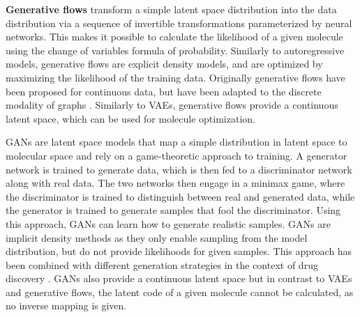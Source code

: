\textbf{Generative flows} \citep{rezendeVariationalInferenceNormalizing2015} transform a simple
latent space distribution into the data distribution via a sequence of invertible transformations
parameterized by neural networks. This makes it possible to calculate the likelihood of a given
molecule using the change of variables formula of probability. Similarly to autoregressive models,
generative flows are explicit density models, and are optimized by maximizing the likelihood of the
training data. Originally generative flows have been proposed for continuous data, but have been
adapted to the discrete modality of graphs
\citep{madhawaGraphNVPInvertibleFlow2019,satorrasEquivariantNormalizingFlows2021,shiGraphAFFlowbasedAutoregressive2019,kuznetsovMolGrowGraphNormalizing2021}.
Similarly to \acp{VAE}, generative flows provide a continuous latent space, which can be used for
molecule optimization.

\Acp{GAN} \citep{goodfellowGenerativeAdversarialNets2014} are latent space models that map a
simple distribution in latent space to molecular space and rely on a game-theoretic approach to
training. A generator network is trained to generate data, which is then fed to a discriminator
network along with real data. The two networks then engage in a minimax game, where the
discriminator is trained to distinguish between real and generated data, while the generator is
trained to generate samples that fool the discriminator. Using this approach, \acp{GAN} can learn
how to generate realistic samples. \Acp{GAN} are implicit density methods as they only enable
sampling from the model distribution, but do not provide likelihoods for given samples. This
approach has been combined with different generation strategies in the context of drug discovery
\citep{caoMolGANImplicitGenerative2022,kadurinDruGANAdvancedGenerative2017,guimaraesObjectiveReinforcedGenerativeAdversarial2017,mendez-lucioNovoGenerationHitlike2020,tangMolecularGenerativeAdversarial2024}.
\acp{GAN} also provide a continuous latent space but in contrast to \acp{VAE} and generative flows,
the latent code of a given molecule cannot be calculated, as no inverse mapping is given.

